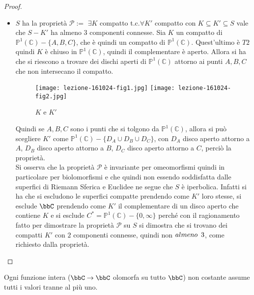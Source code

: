 \begin{proof}
\begin{itemize}
\item $S$ ha la proprietà $\mathcal{P}:= $ $\exists K$ compatto t.c.$\forall K'$ compatto con $K\subseteq K'\subseteq S$ vale che $S\minus K'$ ha almeno $3$ componenti connesse.
Sia $K$ un compatto di $\mathbb{P}^1(\mathbb{C})\minus\{ A, B, C\}$, che è quindi un compatto di $\mathbb{P}^1(\mathbb{C})$. Quest'ultimo è $T2$ quindi $K$ è chiuso in $\mathbb{P}^1(\mathbb{C})$, quindi il complementare è aperto. Allora si ha che si riescono a trovare dei dischi aperti di $\mathbb{P}^1(\mathbb{C})$ attorno ai punti $A, B, C$ che non intersecano il compatto.

\begin{figure}[h]
\texttt{[image: lezione-161024-fig1.jpg]}
\texttt{[image: lezione-161024-fig2.jpg]}
\caption{$K$ e $K'$}\label{fig:1}
\end{figure}

Quindi se $A, B, C$ sono i punti che si tolgono da $\mathbb{P}^1(\mathbb{C})$, allora si può scegliere $K'$ come $\mathbb{P}^1(\mathbb{C})\minus\{D_A\cup D_B\cup D_C\}$, con $D_A$ disco aperto attorno a $A$, $D_B$ disco aperto attorno a $B$, $D_C$ disco aperto attorno a $C$, perciò la proprietà.\\
Si osserva che la proprietà $\mathcal{P}$ è invariante per omeomorfismi quindi in particolare per biolomorfismi e che quindi non essendo soddisfatta dalle superfici di Riemann Sferica e Euclidee ne segue che $S$ è iperbolica.
Infatti si ha che si escludono le superfici compatte prendendo come $K'$ loro stesse, si esclude $\bbC$ prendendo come $K'$ il complementare di un disco aperto che contiene $K$ e si esclude $C^*=\mathbb{P}^1(\mathbb{C})\minus\{ 0,\infty\}$ perché con il ragionamento fatto per dimostrare la proprietà $\mathcal{P}$ su $S$ si dimostra che si trovano dei compatti $K'$ con $2$ componenti connesse, quindi non $almeno\hskip0.5em\relax 3$, come richiesto dalla proprietà.
\end{itemize}
\end{proof}


\begin{teorema}
Ogni funzione intera ($\bbC\rightarrow\bbC$ olomorfa su tutto $\bbC$) non costante assume tutti i valori tranne al più uno.
\end{teorema}

